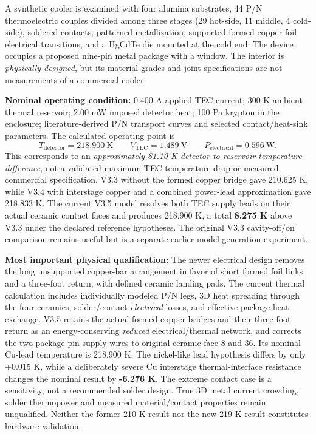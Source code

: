 \documentclass[10pt,a4paper]{article}
\begin{document}
A synthetic cooler is examined with four alumina substrates, 44 P/N thermoelectric couples divided among three stages (29 hot-side, 11 middle, 4 cold-side), soldered contacts, patterned metallization, supported formed copper-foil electrical transitions, and a HgCdTe die mounted at the cold end. The device occupies a proposed nine-pin metal package with a window. The interior is \emph{physically designed}, but its material grades and joint specifications are not measurements of a commercial cooler.

\textbf{Nominal operating condition:} 0.400 A applied TEC current; 300 K ambient thermal reservoir; 2.00 mW imposed detector heat; 100 Pa krypton in the enclosure; literature-derived P/N transport curves and selected contact/heat-sink parameters. The calculated operating point is
\[
\boxed{T_{\mathrm{detector}}=218.900\ \mathrm{K}}\qquad
\boxed{V_{\mathrm{TEC}}=1.489\ \mathrm{V}}\qquad
\boxed{P_{\mathrm{electrical}}=0.596\ \mathrm{W}}.
\]
This corresponds to an \emph{approximately 81.10 K detector-to-reservoir temperature difference}, not a validated maximum TEC temperature drop or measured commercial specification. V3.3 without the formed copper bridge gave 210.625 K, while V3.4 with interstage copper and a combined power-lead approximation gave 218.833 K. The current V3.5 model resolves both TEC supply leads on their actual ceramic contact faces and produces 218.900 K, a total \textbf{8.275 K} above V3.3 under the declared reference hypotheses. The original V3.3 cavity-off/on comparison remains useful but is a separate earlier model-generation experiment.

\textbf{Most important physical qualification:} The newer electrical design removes the long unsupported copper-bar arrangement in favor of short formed foil links and a three-foot return, with defined ceramic landing pads. The current thermal calculation includes individually modeled P/N legs, 3D heat spreading through the four ceramics, solder/contact \emph{electrical} losses, and effective package heat exchange. V3.5 retains the actual formed copper bridges and their three-foot return as an energy-conserving \emph{reduced} electrical/thermal network, and corrects the two package-pin supply wires to original ceramic face 8 and 36. Its nominal Cu-lead temperature is 218.900 K. The nickel-like lead hypothesis differs by only +0.015 K, while a deliberately severe Cu interstage thermal-interface resistance changes the nominal result by \textbf{-6.276 K}. The extreme contact case is a sensitivity, not a recommended solder design. True 3D metal current crowding, solder thermopower and measured material/contact properties remain unqualified. Neither the former 210 K result nor the new 219 K result constitutes hardware validation.
\end{document}
